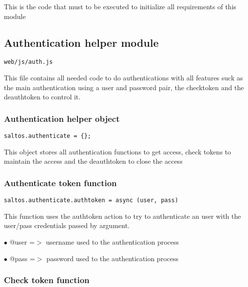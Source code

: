 \documentclass[a4paper]{article}
\begin{document}
This is the code that must to be executed to initialize all requirements of this module

\hypertarget{toc581}{}
\subsection{Authentication helper module}

\begin{lstlisting}
web/js/auth.js
\end{lstlisting}

This file contains all needed code to do authentications with all features suck as the
main authentication using a user and password pair, the checktoken and the deauthtoken
to control it.

\hypertarget{toc582}{}
\subsubsection{Authentication helper object}

\begin{lstlisting}
saltos.authenticate = {};
\end{lstlisting}

This object stores all authentication functions to get access, check tokens to maintain
the access and the deauthtoken to close the access

\hypertarget{toc583}{}
\subsubsection{Authenticate token function}

\begin{lstlisting}
saltos.authenticate.authtoken = async (user, pass)
\end{lstlisting}

This function uses the authtoken action to try to authenticate an user with the user/pass
credentials passed by argument.

\begin{compactitem}
\item[\color{myblue}$\bullet$] @user =$>$ username used to the authentication process
\item[\color{myblue}$\bullet$] @pass =$>$ password used to the authentication process
\end{compactitem}

\hypertarget{toc584}{}
\subsubsection{Check token function}
\end{document}
